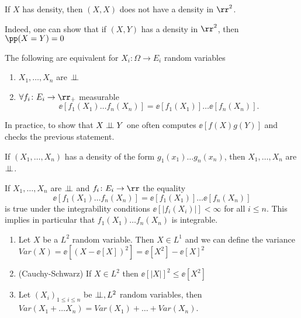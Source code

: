 \documentclass[../main.tex]{subfiles}
\begin{document}
\begin{corollary}
  If $X$ has density, then $(X, X)$ does not have a density in
  $\rr^2$.

  \vspace{0.3em}
  \noindent Indeed, one can show that if $(X, Y)$ has a density in $\rr^2$, then
  $\pp(X = Y) = 0$ 
\end{corollary}

\begin{theorem}
    The following are equivalent for $X_i \colon \Omega \to E_i$
    random variables

    \begin{enumerate}
      \item $X_1, \ldots, X_n$ are $\perp\!\!\!\!\,\perp$
      \item $\forall f_i \colon E_i \to \rr_+$ measurable
        \[
          \ee\left[ f_1(X_1)\ldots f_n(X_n) \right] = 
          \ee[f_1(X_1)] \ldots \ee[f_n(X_n)]
        .\] 
    \end{enumerate}
\end{theorem}

In practice, to show that $X \perp\!\!\!\!\,\perp Y$ one often computes
$\ee[f(X)g(Y)]$ and checks the previous statement.

\begin{corollary}
  If $(X_1, \ldots, X_n)$ has a density of the form $g_1(x_1) \ldots
  g_n(x_n)$, then $X_1, \ldots, X_n$ are $\perp\!\!\!\!\,\perp$.
\end{corollary}

If $X_1, \ldots, X_n $ are $\perp\!\!\!\!\,\perp$ and $f_i \colon E_i \to \rr$ the
equality 
\[
  \ee[f_1(X_1) \ldots f_n(X_n)] =  \ee[f_1(X_1)] \ldots \ee[f_n(X_n)]
\]
is true under the integrability conditions $\ee[|f_i(X_i)|] < \infty$
for all $i \leq n$. This implies in particular that $f_1(X_1)\ldots
f_n(X_n)$ is integrable.

\newpage

\begin{application}
    \hfill

    \begin{enumerate}
      \item Let $X$ be a $L^2$ random variable. Then $X \in L^1$ and we
        can define the variance $Var(X) = \ee[(X - \ee[X])^2] =
        \ee[X^2] - \ee[X]^2$
      \item {(\sffamily Cauchy-Schwarz)} If $X \in L^2$ then
        $\ee[|X|]^2 \leq \ee[X^2]$
      \item Let $(X_i)_{1 \leq i \leq n}$ be $\perp\!\!\!\!\,\perp, L^2$ random
        variables, then $Var(X_1 + \ldots X_n) = Var(X_1) + \ldots +
        Var(X_n)$.
    \end{enumerate}

\end{application}
\end{document}
